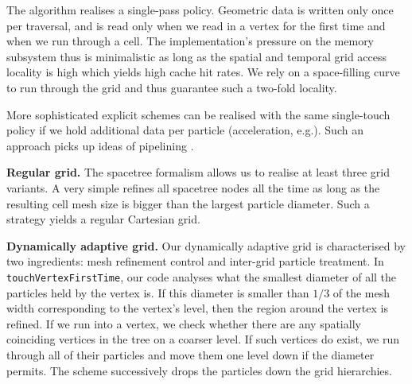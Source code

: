 \documentclass[times,12pt]{article}
\begin{document}
The algorithm realises a single-pass policy. Geometric data is written only once
per traversal, and is read only when we read in a vertex for the first time and
when we run through a cell.
The implementation's pressure on the memory subsystem thus is minimalistic as
long as the spatial and temporal grid access locality \cite{Iglberger2010} is high which
yields high cache hit rates.
We rely on a space-filling curve to
run through the grid \cite{Weinzierl:2009:Diss,Weinzierl:11:Peano} and thus
guarantee such a two-fold locality.

\noindent
More sophisticated explicit schemes can be realised with the same single-touch
policy if we hold additional data per particle (acceleration, e.g.).
Such an approach picks up ideas of pipelining \cite{Plimpton1995}.

{\bf Regular grid.}
The spacetree formalism allows us to realise at least three grid variants. 
A very simple refines all spacetree nodes all the time as long as the resulting
cell mesh size is bigger than the largest particle diameter.
Such a strategy yields a regular Cartesian grid. 

{\bf Dynamically adaptive grid.}
Our dynamically adaptive grid is characterised by two ingredients: mesh
refinement control and inter-grid particle treatment.
In \texttt{touchVertexFirstTime}, our code analyses what the smallest diameter
of all the particles held by the vertex is.
If this diameter is smaller than $1/3$ of the mesh width corresponding to the
vertex's level, then the region around the vertex is refined.
If we run into a vertex, we check whether there are any spatially coinciding
vertices in the tree on a coarser level.
If such vertices do exist, we run through all of their particles and move them
one level down if the diameter permits.
The scheme successively drops the particles down the grid hierarchies.
\end{document}
